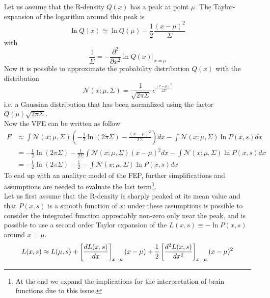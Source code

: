 \documentclass[a4paper, 10pt]{article}
\begin{document}
Let us assume that the R-density $Q(x)$ has a peak at point $\mu$. The Taylor-expansion of the logarithm around this peak is
\begin{equation}
\ln Q(x) \simeq \ln Q(\mu) - \frac{1}{2} \frac{(x-\mu)^2}{\Sigma} 
\end{equation}
with
\begin{equation}
\frac{1}{\Sigma} = - \frac{\partial^{2} }{\partial x^2} \ln Q(x) \bigg\rvert_{x=\mu} 
\end{equation}
Now it is possible to approximate the probability distribution $Q(x)$ with the distribution
\begin{equation}
\mathcal{N}(x;\mu, \Sigma) = \frac{1}{\sqrt{ 2 \pi \Sigma}} \, e^{\frac{(x-\mu)^2}{2 \Sigma}}
\end{equation}
i.e. a Gaussian distribution that has been normalized using the factor $Q(\mu) \sqrt{2 \pi \Sigma }$.\\
Now the VFE can be written as follow
\begin{equation}
\begin{split}
F   & \approx \int \mathcal{N}(x;\mu,\Sigma) (-\frac{1}{2} \ln (2 \pi \Sigma) - \frac{(x-\mu)^2}{2 \Sigma} ) d x - \int \mathcal{N}(x;\mu,\Sigma) \ln P(x,s) d x \\
    & = -\frac{1}{2} \ln (2 \pi \Sigma) - \frac{1}{2 \Sigma} \int \mathcal{N}(x;\mu,\Sigma) (x-\mu)^2  d x - \int \mathcal{N}(x;\mu,\Sigma) \ln P(x,s) d x \\
    & = -\frac{1}{2} \ln (2 \pi \Sigma) - \frac{1}{2} - \int \mathcal{N}(x;\mu,\Sigma) \ln P(x,s) d x
\end{split}
\end{equation}
To end up with an analityc model of the FEP, further simplifications and assumptions are needed to evaluate the last term\footnote{At the end we expand the implications for the interpretation of brain functions due to this issue.}. \\
Let us first assume that the R-density is sharply peaked at its mean value and that $P(x,s)$ is a smooth function of $x$: under these assumptions is possible to consider the integrated function appreciably non-zero only near the peak, and is possible to use a second order Taylor expansion of the $L(x,s) \equiv - \ln P(x,s)$ around $x=\mu$.
\begin{equation}
L(x,s) \approx L(\mu,s) + \left[ \frac{dL(x,s)}{dx} \right]_{x=\mu} (x-\mu) + \frac{1}{2} \left[ \frac{d^2L(x,s)}{dx^2} \right]_{x=\mu} (x-\mu)^2 \\
\end{equation}
\end{document}
